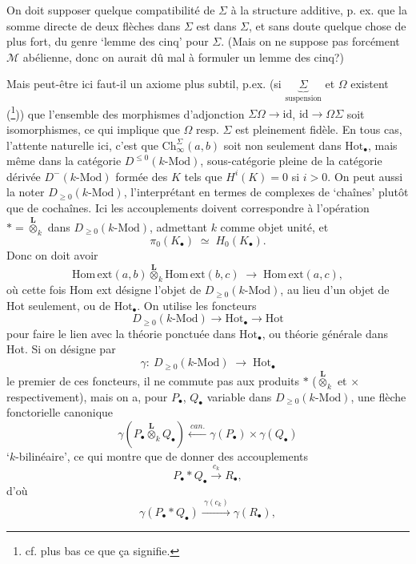 \documentclass[11pt]{article}
\newcommand{\printedpage}[1]{\marginpar{\footnotesize p.~#1}}
\newcommand{\msp}[1]{\marginpar{\footnotesize [#1]}}
\newcommand{\M}{\mathcal{M}}
\newcommand{\Hot}{\mathrm{Hot}}
\newcommand{\Ch}{\mathrm{Ch}}
\newcommand{\Homext}{\mathrm{Hom\,ext}}
\newcommand{\Lotimes}{\overset{\mathbf{L}}{\otimes}}
\begin{document}
On doit supposer quelque compatibilité de $\Sigma$ à la structure additive, p. ex. que la somme directe de deux flèches dans $\Sigma$ est dans $\Sigma$, et sans doute quelque chose de plus fort, du genre `lemme des cinq' pour $\Sigma$. (Mais on ne suppose pas forcément $\M$ abélienne, donc on aurait dû mal à formuler un lemme des cinq?) %

\msp{page 19}

Mais peut-être ici faut-il un axiome plus subtil, p.ex. (si $\underbrace{\Sigma}_{\text{suspension}}$ et $\Omega$ existent (\footnote[7]{cf. plus bas ce que ça signifie.})) que l'ensemble des morphismes d'adjonction $\Sigma\Omega \longrightarrow \mathrm{id}$, $\mathrm{id} \longrightarrow \Omega\Sigma$ soit isomorphismes, ce qui implique que $\Omega$ resp. $\Sigma$ est pleinement fidèle. En tous cas, l'attente naturelle ici, c'est que $\Ch^{\Sigma}_{\infty}(a,b)$ soit non seulement dans $\Hot_{\bullet}$, mais même dans la catégorie $D^{\leq 0}(k\text{-Mod})$, sous-catégorie pleine de la catégorie dérivée $D^{-}(k\text{-Mod})$ formée des $K$ tels que $H^{i}(K) = 0$ si $i > 0$. On peut aussi la noter $D_{\geq 0}(k\text{-Mod})$, l'interprétant en
\printedpage{12}
termes de complexes de `chaînes' plutôt que de cochaînes. Ici les accouplements doivent correspondre à l'opération $* = \Lotimes_k$ dans $D_{\geq 0}(k\text{-Mod})$, admettant $k$ comme objet unité, et
\[
\pi_0(K_{\bullet}) \;\simeq\; H_0(K_{\bullet}).
\]
Donc on doit avoir
\[
\Homext(a,b) \Lotimes_k \Homext(b,c) \;\longrightarrow\; \Homext(a,c),
\]
où cette fois Hom ext désigne l'objet de $D_{\geq 0}(k\text{-Mod})$, au lieu d'un objet de Hot seulement, ou de $\Hot_{\bullet}$. On utilise les foncteurs
\[
D_{\geq 0}(k\text{-Mod}) \longrightarrow \Hot_{\bullet} \longrightarrow \Hot
\]
\msp{page 20}
pour faire le lien avec la théorie ponctuée dans $\Hot_{\bullet}$, ou théorie générale dans Hot. Si on désigne par
\[
\gamma :\ D_{\geq 0}(k\text{-Mod}) \;\longrightarrow\; \Hot_{\bullet}
\]
le premier de ces foncteurs, il ne commute pas aux produits $*$ ($\Lotimes_k$ et $\times$ respectivement), mais on a, pour $P_{\bullet}$, $Q_{\bullet}$ variable dans $D_{\geq 0}(k\text{-Mod})$, une flèche fonctorielle canonique %
\[
\gamma(P_{\bullet} \Lotimes_k Q_{\bullet}) \xleftarrow{\ \mathit{can.}\ } \gamma(P_{\bullet})\times\gamma(Q_{\bullet})
\]
`$k$-bilinéaire', ce qui montre que de donner des accouplements
\[
P_{\bullet} * Q_{\bullet} \xrightarrow{\ c_k\ } R_{\bullet},
\]
d'où
\[
\gamma(P_{\bullet} * Q_{\bullet}) \xrightarrow{\ \gamma(c_k)\ } \gamma(R_{\bullet}), \tag*{$(*)$}
\]
\end{document}
